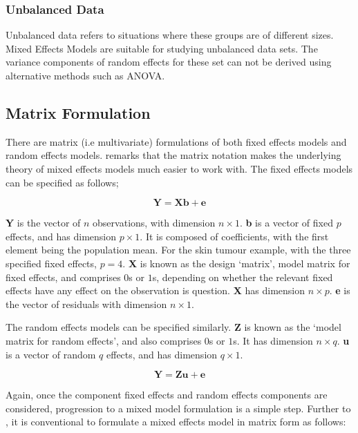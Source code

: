 \documentclass[12pt, a4paper]{report}
\theoremstyle{plain}
\theoremstyle{definition}
\theoremstyle{remark}
\begin{document}
\subsubsection{Unbalanced Data} Unbalanced data refers to situations where these groups are
of different sizes. Mixed Effects Models are suitable for studying
unbalanced data sets. The variance components of random effects
for these set can not be derived using alternative methods such as
ANOVA.

\subsection{Matrix Formulation} There are matrix (i.e multivariate)
formulations of both fixed effects models and random effects
models. \citet{BrownPrescott} remarks that the matrix notation
makes the underlying theory of mixed effects models much easier to
work with. The fixed effects models can be specified as follows;

\begin{equation}
\textbf{Y} = \textbf{Xb} + \textbf{e}
\end{equation}

\textbf{Y} is the vector of $n$ observations, with dimension $n
\times 1$. \textbf{b} is a vector of fixed $p$ effects, and has
dimension $p \times 1$. It is composed of coefficients, with the
first element being the population mean. For the skin tumour
example, with the three specified fixed effects, $p=4$. \textbf{X}
is known as the design `matrix', model matrix for fixed effects,
and comprises $0$s or $1$s, depending on whether the relevant
fixed effects have any effect on the observation is question.
\textbf{X} has dimension $n \times p$. \textbf{e} is the vector of
residuals with dimension $n \times 1$.

The random effects models can be specified similarly. \textbf{Z}
is known as the `model matrix for random effects', and also
comprises $0$s or $1$s. It has dimension $n \times q$. \textbf{u}
is a vector of random $q$ effects, and has dimension $q \times 1$.

\begin{equation}
\textbf{Y} = \textbf{Zu} + \textbf{e}
\end{equation}

Again, once the component fixed effects and random effects
components are considered, progression to a mixed model
formulation is a simple step. Further to \citet{lw82}, it is
conventional to formulate a mixed effects model in matrix form as
follows:
\end{document}
